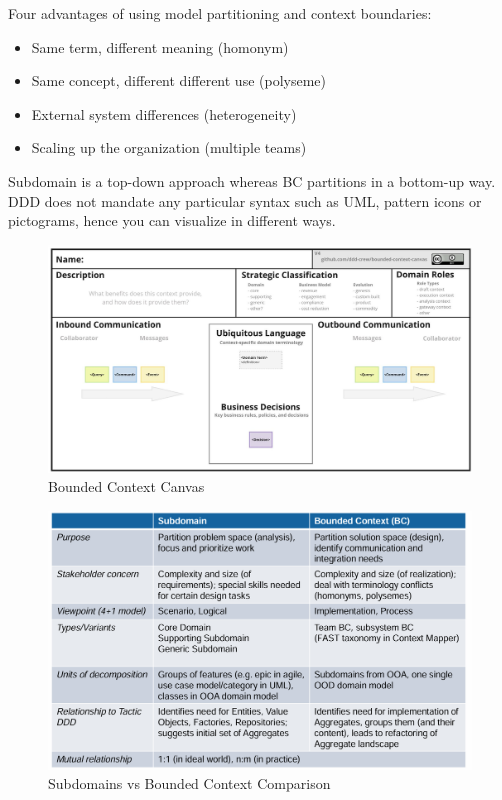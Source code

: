 \documentclass[../Main.tex]{subfiles}
\begin{document}
Four advantages of using model partitioning and context boundaries:
\begin{itemize}
    \item Same term, different meaning (homonym)
    \item Same concept, different different use (polyseme)
    \item External system differences (heterogeneity)
    \item Scaling up the organization (multiple teams)
\end{itemize}

Subdomain is a top-down approach whereas BC partitions in a bottom-up way.
DDD does not mandate any particular syntax such as UML, pattern icons or pictograms, hence you can visualize in different ways.

\begin{figure}[H]
    \centering
    \includegraphics[width=1\linewidth]{Images/bounded-context-canvas.png}
    \caption{Bounded Context Canvas}
\end{figure}

\begin{figure}[H]
    \centering
    \includegraphics[width=1\linewidth]{Images/subdomain-vs-bc.png}
    \caption{Subdomains vs Bounded Context Comparison}
\end{figure}
\end{document}
